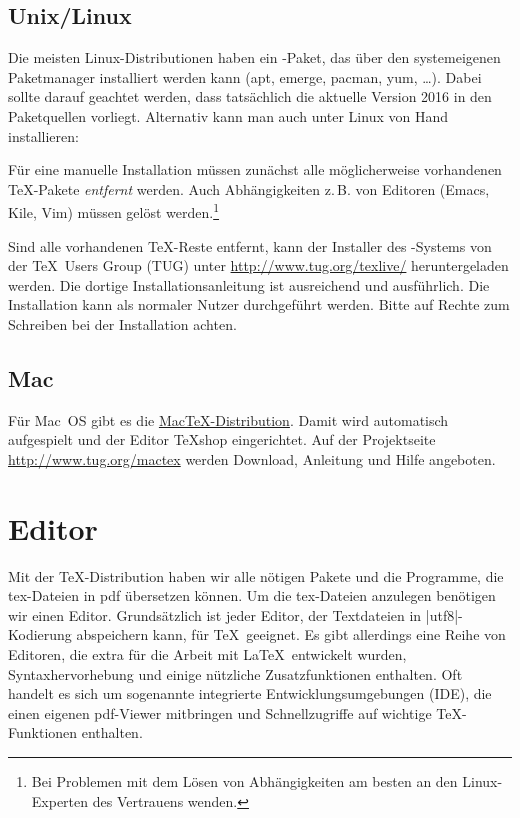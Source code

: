 \documentclass[
	vorläufig=false, 
	datum=2017-10-16,
	titel=Installationshinweise,
]{../tex/latexkurs-exercise}
\begin{document}
\subsection*{Unix/Linux}

Die meisten Linux-Distributionen haben ein \TeXlive-Paket, das über den systemeigenen Paketmanager installiert werden kann (apt, emerge, pacman, yum, …).
Dabei sollte darauf geachtet werden, dass tatsächlich die aktuelle Version 2016 in den Paketquellen vorliegt. Alternativ kann man \TeXlive auch unter Linux von Hand installieren:


Für eine manuelle Installation müssen zunächst alle möglicherweise vorhandenen \TeX-Pakete \emph{entfernt} werden. Auch Abhängigkeiten z.\,B. von Editoren (Emacs, Kile, Vim) müssen gelöst werden.\footnote{Bei Problemen mit dem Lösen von Abhängigkeiten am besten an den Linux-Experten des Vertrauens wenden.}

Sind alle vorhandenen \TeX-Reste entfernt, kann der Installer des \TeXlive-Systems von der \TeX\ Users Group (TUG) unter \url{http://www.tug.org/texlive/} heruntergeladen werden. Die dortige Installationsanleitung ist ausreichend und ausführlich. Die Installation kann als normaler Nutzer durchgeführt werden. Bitte auf Rechte zum Schreiben bei der Installation achten.

\enlargethispage{\baselineskip}

\subsection*{Mac}
Für Mac~OS gibt es die \href{http://www.tug.org/mactex}{Mac\TeX-Distribution}. Damit wird automatisch  \TeXlive aufgespielt und  der Editor \TeX shop eingerichtet. Auf der Projektseite \url{http://www.tug.org/mactex} werden Download, Anleitung und Hilfe angeboten.


\newpage

\section{Editor}

Mit der \TeX-Distribution haben wir alle nötigen Pakete und die Programme, die tex-Dateien in pdf übersetzen können. Um die tex-Dateien anzulegen benötigen wir einen Editor. Grundsätzlich ist jeder Editor, der Textdateien in |utf8|-Kodierung abspeichern kann, für \TeX\ geeignet. Es gibt allerdings eine Reihe von Editoren, die extra für die Arbeit mit \LaTeX\ entwickelt wurden, Syntaxhervorhebung und einige nützliche Zusatzfunktionen enthalten. Oft handelt es sich um sogenannte integrierte Entwicklungsumgebungen (IDE), die einen eigenen pdf-Viewer mitbringen und Schnellzugriffe auf wichtige \TeX-Funktionen enthalten.
\end{document}
